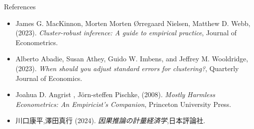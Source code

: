 \documentclass[xcolor=svgnames,aspectratio=169]{beamer}
\begin{document}
\begin{frame}{References}
    \begin{itemize}
        \item James G. MacKinnon, Morten Morten Ørregaard Nielsen, Matthew D. Webb, (2023). 
        \textit{Cluster-robust inference: A guide to empirical practice}, Journal of Econometrics.
        \item Alberto Abadie, Susan Athey, Guido W. Imbens, and Jeffrey M. Wooldridge, (2023).
        \textit{When should you adjust standard errors for clustering?}, Quarterly Journal of Economics.
        \item Joahua D. Angrist , J\"{o}rn-steffen Pischke, (2008).
        \textit{Mostly Harmless Econometrics: An Empiricist's Companion}, Princeton University Press.
        \item 川口康平,澤田真行 (2024). 
        \textit{因果推論の計量経済学},日本評論社.
    \end{itemize}
\end{frame}
\end{document}
